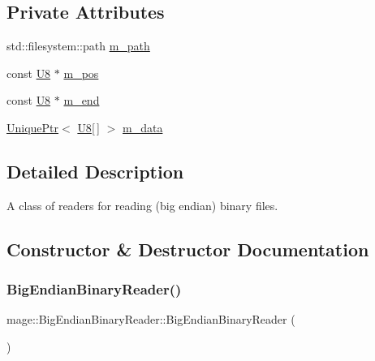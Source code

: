 \subsection*{Private Attributes}
\begin{DoxyCompactItemize}
\item 
std\+::filesystem\+::path \mbox{\hyperlink{classmage_1_1_big_endian_binary_reader_a4b8ac6558a16e53ee52c8a81b5b43b91}{m\+\_\+path}}
\item 
const \mbox{\hyperlink{namespacemage_afc638980bc6154f15af5e2d93a0e0ea9}{U8}} $\ast$ \mbox{\hyperlink{classmage_1_1_big_endian_binary_reader_a7dbfc5ce1712e431f75d80a4f7a56e33}{m\+\_\+pos}}
\item 
const \mbox{\hyperlink{namespacemage_afc638980bc6154f15af5e2d93a0e0ea9}{U8}} $\ast$ \mbox{\hyperlink{classmage_1_1_big_endian_binary_reader_ab4f707d30799b98afed0f9adfc27a3e2}{m\+\_\+end}}
\item 
\mbox{\hyperlink{namespacemage_a3316d7143a973e37adf1110f2e80ca31}{Unique\+Ptr}}$<$ \mbox{\hyperlink{namespacemage_afc638980bc6154f15af5e2d93a0e0ea9}{U8}}\mbox{[}$\,$\mbox{]} $>$ \mbox{\hyperlink{classmage_1_1_big_endian_binary_reader_a54128bdaa233c1bd20494189b2397fe3}{m\+\_\+data}}
\end{DoxyCompactItemize}


\subsection{Detailed Description}
A class of readers for reading (big endian) binary files. 

\subsection{Constructor \& Destructor Documentation}
\mbox{\label{classmage_1_1_big_endian_binary_reader_a1fd0dbee6950a8cb04aa399f0cdbaf2a}} 
\subsubsection{\texorpdfstring{Big\+Endian\+Binary\+Reader()}{BigEndianBinaryReader()}\hspace{0.1cm}{\footnotesize\ttfamily [1/3]}}
{\footnotesize\ttfamily mage\+::\+Big\+Endian\+Binary\+Reader\+::\+Big\+Endian\+Binary\+Reader (\begin{DoxyParamCaption}{ }\end{DoxyParamCaption})\hspace{0.3cm}{\ttfamily [protected]}}

